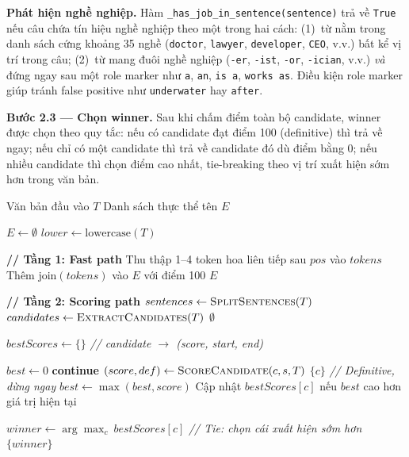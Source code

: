 \textbf{Phát hiện nghề nghiệp.}
Hàm \texttt{\_has\_job\_in\_sentence(sentence)} trả về \texttt{True} nếu câu
chứa tín hiệu nghề nghiệp theo một trong hai cách:
(1)~từ nằm trong danh sách cứng khoảng 35 nghề (\texttt{doctor}, \texttt{lawyer},
\texttt{developer}, \texttt{CEO}, v.v.) bất kể vị trí trong câu;
(2)~từ mang đuôi nghề nghiệp (\texttt{-er}, \texttt{-ist}, \texttt{-or},
\texttt{-ician}, v.v.) \textit{và} đứng ngay sau một role marker như \texttt{a},
\texttt{an}, \texttt{is a}, \texttt{works as}. Điều kiện role marker giúp tránh
false positive như \texttt{underwater} hay \texttt{after}.

\textbf{Bước 2.3 --- Chọn winner.}
Sau khi chấm điểm toàn bộ candidate, winner được chọn theo quy tắc:
nếu có candidate đạt điểm 100 (definitive) thì trả về ngay;
nếu chỉ có một candidate thì trả về candidate đó dù điểm bằng 0;
nếu nhiều candidate thì chọn điểm cao nhất, tie-breaking theo vị trí
xuất hiện sớm hơn trong văn bản.

\begin{algorithm}[H]
\caption{Thuật toán nhận diện tên người}
\label{alg:detect_name}
\begin{algorithmic}[1]
\Require Văn bản đầu vào $T$
\Ensure Danh sách thực thể tên $E$

\State $E \leftarrow \emptyset$
\State $lower \leftarrow \text{lowercase}(T)$

\Statex \hspace{-\algorithmicindent}\textbf{// Tầng 1: Fast path}
        \State Thu thập 1--4 token hoa liên tiếp sau $pos$ vào $tokens$
            \State Thêm $\text{join}(tokens)$ vào $E$ với điểm 100
        \EndIf
    \EndFor
\EndFor
{} \Return $E$ \EndIf

\Statex \hspace{-\algorithmicindent}\textbf{// Tầng 2: Scoring path}
\State $sentences \leftarrow \textsc{SplitSentences}(T)$
\State $candidates \leftarrow \textsc{ExtractCandidates}(T)$
 \Return $\emptyset$ \EndIf

\State $bestScores \leftarrow \{\}$ \quad \textit{// candidate $\to$ (score, start, end)}

    \State $best \leftarrow 0$
         \textbf{continue} \EndIf
        \State $(score, def) \leftarrow \textsc{ScoreCandidate}(c, s, T)$
            \State \Return $\{c\}$ \quad \textit{// Definitive, dừng ngay}
        \EndIf
        \State $best \leftarrow \max(best, score)$
    \EndFor
    \State Cập nhật $bestScores[c]$ nếu $best$ cao hơn giá trị hiện tại
\EndFor

\State $winner \leftarrow \arg\max_{c}\ bestScores[c]$ \quad \textit{// Tie: chọn cái xuất hiện sớm hơn}
\State \Return $\{winner\}$
\end{algorithmic}
\end{algorithm}

